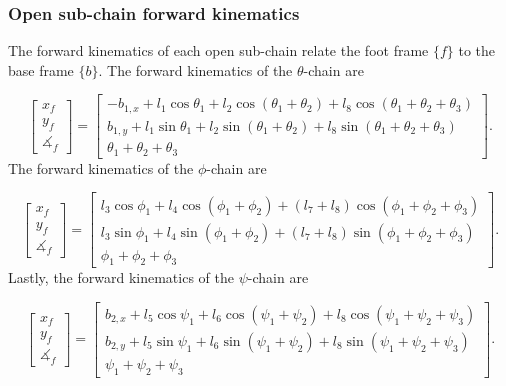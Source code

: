 \documentclass{report}
\begin{document}
\subsubsection[Open sub-chain forward kinematics]{Open sub-chain forward kinematics}
The forward kinematics of each open sub-chain relate the foot frame $\lbrace f\rbrace$ to the base frame $\lbrace b\rbrace$. The forward kinematics of the $\theta$-chain are

\begin{equation}
\begin{bmatrix}
x_{f} \\ 
y_{f} \\
\measuredangle_{f}
\end{bmatrix}
=
\begin{bmatrix}
-b_{1,x} + l_{1}\cos{\theta_{1}} + l_{2}\cos{\left(\theta_{1}+\theta_{2}\right)} + l_{8}\cos{\left(\theta_{1}+\theta_{2}+\theta_{3}\right)}\\
b_{1,y} + l_{1}\sin{\theta_{1}} + l_{2}\sin{\left(\theta_{1}+\theta_{2}\right)} + l_{8}\sin{\left(\theta_{1}+\theta_{2}+\theta_{3}\right)}\\
\theta_{1} + \theta_{2} + \theta_{3}
\end{bmatrix}\text{.}
\end{equation}
The forward kinematics of the $\phi$-chain are

\begin{equation}
\begin{bmatrix}
x_{f} \\ 
y_{f} \\
\measuredangle_{f}
\end{bmatrix}
=
\begin{bmatrix}
l_{3}\cos{\phi_{1}} + l_{4}\cos{\left(\phi_{1}+\phi_{2}\right)} + \left(l_{7} + l_{8}\right)\cos{\left(\phi_{1}+\phi_{2}+\phi_{3}\right)}\\
l_{3}\sin{\phi_{1}} + l_{4}\sin{\left(\phi_{1}+\phi_{2}\right)} + \left(l_{7} + l_{8}\right)\sin{\left(\phi_{1}+\phi_{2}+\phi_{3}\right)}\\
\phi_{1} + \phi_{2} + \phi_{3}
\end{bmatrix}\text{.}
\end{equation}
Lastly, the forward kinematics of the $\psi$-chain are

\begin{equation}
\begin{bmatrix}
x_{f} \\ 
y_{f} \\
\measuredangle_{f}
\end{bmatrix}
=
\begin{bmatrix}
b_{2,x} + l_{5}\cos{\psi_{1}} + l_{6}\cos{\left(\psi_{1}+\psi_{2}\right)} + l_{8}\cos{\left(\psi_{1}+\psi_{2}+\psi_{3}\right)}\\
b_{2,y} + l_{5}\sin{\psi_{1}} + l_{6}\sin{\left(\psi_{1}+\psi_{2}\right)} + l_{8}\sin{\left(\psi_{1}+\psi_{2}+\psi_{3}\right)}\\
\psi_{1} + \psi_{2} + \psi_{3}
\end{bmatrix}\text{.}
\end{equation}
\end{document}
